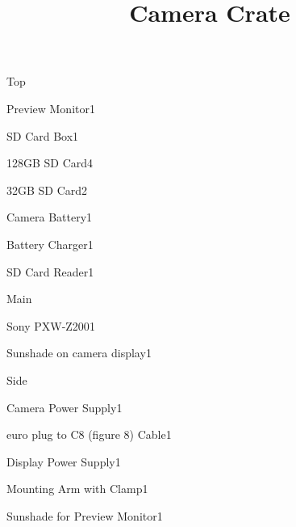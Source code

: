 \def\papersize{5}




\title{Camera Crate}

\begin{checklist}{Top}
  \item{Preview Monitor}{1}
  \item{SD Card Box}{1}
  \item{128GB SD Card}{4}
  \item{32GB SD Card}{2}
  \item{Camera Battery}{1}
  \item{Battery Charger}{1}
  \item{SD Card Reader}{1}
\end{checklist}

\begin{checklist}{Main}
  \item{Sony PXW-Z200}{1}
  \item{Sunshade on camera display}{1}
\end{checklist}

\begin{checklist}{Side}
  \item{Camera Power Supply}{1}
  \item{euro plug to C8 (figure 8) Cable}{1}
  \item{Display Power Supply}{1}
  \item{Mounting Arm with Clamp}{1}
  \item{Sunshade for Preview Monitor}{1}
\end{checklist}


